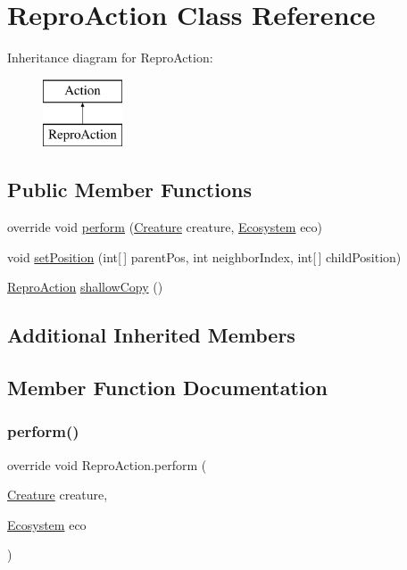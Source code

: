 \hypertarget{class_repro_action}{}\section{Repro\+Action Class Reference}
\label{class_repro_action}
Inheritance diagram for Repro\+Action\+:\begin{figure}[H]
\begin{center}
\leavevmode
\includegraphics[height=2.000000cm]{class_repro_action}
\end{center}
\end{figure}
\subsection*{Public Member Functions}
\begin{DoxyCompactItemize}
\item 
override void \mbox{\hyperlink{class_repro_action_ab018325092d2a13cf333a8576c7f9dd0}{perform}} (\mbox{\hyperlink{class_creature}{Creature}} creature, \mbox{\hyperlink{class_ecosystem}{Ecosystem}} eco)
\item 
void \mbox{\hyperlink{class_repro_action_a0f1b2a6774238b935c3b2c544be7b5e0}{set\+Position}} (int\mbox{[}$\,$\mbox{]} parent\+Pos, int neighbor\+Index, int\mbox{[}$\,$\mbox{]} child\+Position)
\item 
\mbox{\hyperlink{class_repro_action}{Repro\+Action}} \mbox{\hyperlink{class_repro_action_ae68477b2e64171bf9a3bf20458fcc96c}{shallow\+Copy}} ()
\end{DoxyCompactItemize}
\subsection*{Additional Inherited Members}


\subsection{Member Function Documentation}
\mbox{\label{class_repro_action_ab018325092d2a13cf333a8576c7f9dd0}} 
\subsubsection{\texorpdfstring{perform()}{perform()}}
{\footnotesize\ttfamily override void Repro\+Action.\+perform (\begin{DoxyParamCaption}\item[{\mbox{\hyperlink{class_creature}{Creature}}}]{creature,  }\item[{\mbox{\hyperlink{class_ecosystem}{Ecosystem}}}]{eco }\end{DoxyParamCaption})\hspace{0.3cm}{\ttfamily [virtual]}}



